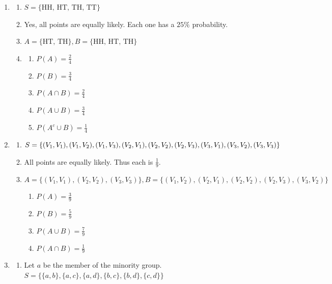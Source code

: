 \documentclass{article}
\newcommand{\set}[1]{\{#1\}}
\begin{document}
\begin{enumerate}
    \item \begin{enumerate}
      \item $S = \set{\text{HH, HT, TH, TT}}$
      \item Yes, all points are equally likely. Each one has a $25\%$ probability.
      \item $A = \set{\text{HT, TH}}, B = \set{\text{HH, HT, TH}}$
      \item \begin{enumerate}
        \item $P(A) = \frac{2}{4}$
        \item $P(B) = \frac{3}{4}$
        \item $P(A\cap B) = \frac{2}{4}$
        \item $P(A\cup B) = \frac{3}{4}$
        \item $P(A^c \cup B) = \frac{1}{4}$
      \end{enumerate}
    \end{enumerate}
    \item \begin{enumerate}
      \item $S = \set{\\
    (V_1, V_1), (V_1, V_2), (V_1, V_3),\\
    (V_2, V_1), (V_2, V_2), (V_2, V_3),\\
    (V_3, V_1), (V_3, V_2), (V_3, V_3)
    \\}$
    \item All points are equally likely. Thus each is $\frac{1}{9}$.
    \item $A = \set{(V_1, V_1), (V_2, V_2), (V_3, V_3)}, B = \set{(V_1, V_2), (V_2, V_1), (V_2, V_2), (V_2, V_3), (V_3, V_2)}$
      \begin{enumerate}
        \item $P(A) = \frac{3}{9}$
        \item $P(B) = \frac{5}{9}$
        \item $P(A\cup B) = \frac{7}{9}$
        \item $P(A \cap B) = \frac{1}{9}$
      \end{enumerate}
    \end{enumerate}
    \item \begin{enumerate}
      \item Let $a$ be the member of the minority group.\\
      $S = \set{\set{a,b}, \set{a,c}, \set{a,d}, \set{b,c}, \set{b,d}, \set{c,d}}$

\end{enumerate}
\end{enumerate}
\end{document}

